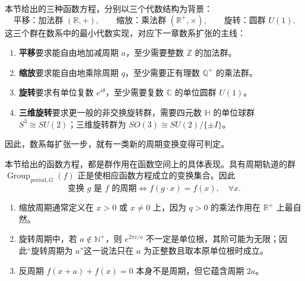 \begin{remark}[与数系扩张的接口]\label{rem:function_features_number_systems}
本节给出的三种函数方程，分别以三个代数结构为背景：
\[
\text{平移：加法群 }(\mathbb{R},+),\qquad
\text{缩放：乘法群 }(\mathbb{R}^+,\times),\qquad
\text{旋转：圆群 }U(1).
\]
这三个群在数系中的最小代数实现，对应下一章数系扩张的主线：
\begin{enumerate}[label=(\roman*)]
    \item \textbf{平移}要求能自由地加减周期 $a$，至少需要整数 $\mathbb{Z}$ 的加法群。
    \item \textbf{缩放}要求能自由地乘除周期 $q$，至少需要正有理数 $\mathbb{Q}^+$ 的乘法群。
    \item \textbf{旋转}要求有单位复数 $e^{i\theta}$，至少需要复数 $\mathbb{C}$ 的单位圆群 $U(1)$。
    \item \textbf{三维旋转}要求更一般的非交换旋转群，需要四元数 $\mathbb{H}$ 的单位球群 $S^3\cong SU(2)$；三维旋转群为 $SO(3)\cong SU(2)/\{\pm I\}$。
\end{enumerate}
因此，数系每扩张一步，就有一类新的周期变换变得可判定。
\end{remark}

\begin{remark}[与群作用框架的衔接]\label{rem:function_features_group_action}
本节给出的函数方程，都是群作用在函数空间上的具体表现。具有周期轨道的群 $\operatorname{Group}_{\mathrm{period},G}(f)$ 正是使相应函数方程成立的变换集合。因此
\[
\text{变换 }g\text{ 是 }f\text{ 的周期}
\iff
f(g\cdot x)=f(x),\quad \forall x.
\]
\end{remark}

\begin{remark}[定义域与阶的边界]\label{rem:function_features_boundary}
\begin{enumerate}[label=(\roman*)]
    \item 缩放周期通常定义在 $x>0$ 或 $x\neq 0$ 上，因为 $q>0$ 的乘法作用在 $\mathbb{R}^+$ 上最自然。
    \item 旋转周期中，若 $a\notin\mathbb{N}^+$，则 $e^{2\pi i/a}$ 不一定是单位根，其阶可能为无限；因此“旋转周期为 $a$”这一说法只在 $a$ 为正整数且取本原单位根时成立。
    \item 反周期 $f(x+a)+f(x)=0$ 本身不是周期，但它蕴含周期 $2a$。
\end{enumerate}
\end{remark}

